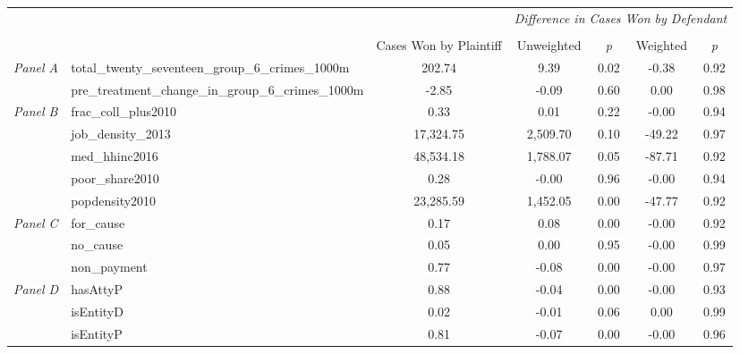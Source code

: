 \begin{tabular}{llccccc}
\toprule
 &  & \textit{} & \multicolumn{4}{c}{\textit{Difference in Cases Won by Defendant}} \\
\cline{4-7}
\\
 &  & Cases Won by Plaintiff & Unweighted & \emph{p} & Weighted & \emph{p} \\
\midrule
\multirow[c]{2}{3cm}{\textit{Panel A}} & total_twenty_seventeen_group_6_crimes_1000m & 202.74 & 9.39 & 0.02 & -0.38 & 0.92 \\
 & pre_treatment_change_in_group_6_crimes_1000m & -2.85 & -0.09 & 0.60 & 0.00 & 0.98 \\
\cline{1-7}
\multirow[c]{5}{3cm}{\textit{Panel B}} & frac_coll_plus2010 & 0.33 & 0.01 & 0.22 & -0.00 & 0.94 \\
 & job_density_2013 & 17,324.75 & 2,509.70 & 0.10 & -49.22 & 0.97 \\
 & med_hhinc2016 & 48,534.18 & 1,788.07 & 0.05 & -87.71 & 0.92 \\
 & poor_share2010 & 0.28 & -0.00 & 0.96 & -0.00 & 0.94 \\
 & popdensity2010 & 23,285.59 & 1,452.05 & 0.00 & -47.77 & 0.92 \\
\cline{1-7}
\multirow[c]{3}{3cm}{\textit{Panel C}} & for_cause & 0.17 & 0.08 & 0.00 & -0.00 & 0.92 \\
 & no_cause & 0.05 & 0.00 & 0.95 & -0.00 & 0.99 \\
 & non_payment & 0.77 & -0.08 & 0.00 & -0.00 & 0.97 \\
\cline{1-7}
\multirow[c]{3}{3cm}{\textit{Panel D}} & hasAttyP & 0.88 & -0.04 & 0.00 & -0.00 & 0.93 \\
 & isEntityD & 0.02 & -0.01 & 0.06 & 0.00 & 0.99 \\
 & isEntityP & 0.81 & -0.07 & 0.00 & -0.00 & 0.96 \\
\cline{1-7}
\bottomrule
\end{tabular}
